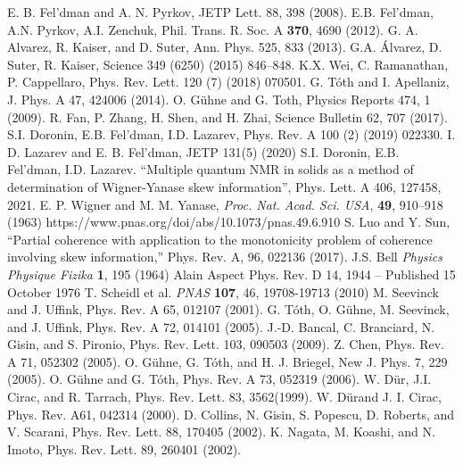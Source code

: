 \begin{thebibliography}{}
  E. B. Fel'dman and A. N. Pyrkov, JETP Lett. 88, 398 (2008).
  E.B. Fel'dman, A.N. Pyrkov, A.I. Zenchuk, Phil. Trans. R. Soc. A {\bf 370}, 4690 (2012).
  G. A. Alvarez, R. Kaiser, and D. Suter, Ann. Phys. 525, 833 (2013).
  G.A. Álvarez, D. Suter, R. Kaiser, Science 349 (6250) (2015) 846–848.
  K.X. Wei, C. Ramanathan, P. Cappellaro, Phys. Rev. Lett. 120 (7) (2018) 070501.
  G. T\'oth and I. Apellaniz, J. Phys. A 47, 424006 (2014).
  O. G\"uhne and G. Toth, Physics Reports 474, 1 (2009).
  R. Fan, P. Zhang, H. Shen, and H. Zhai, Science Bulletin 62, 707 (2017).
  S.I. Doronin, E.B. Fel’dman, I.D. Lazarev, Phys. Rev. A 100 (2) (2019) 022330.
  I. D. Lazarev and E. B. Fel'dman, JETP 131(5) (2020)
  S.I. Doronin, E.B. Fel’dman, I.D. Lazarev. “Multiple quantum NMR in solids as a method of determination of Wigner-Yanase skew information”, Phys. Lett. A 406, 127458, 2021.
  E. P. Wigner and M. M. Yanase, \textit{Proc. Nat. Acad. Sci. USA}, \textbf{49}, 910–918 (1963) https://www.pnas.org/doi/abs/10.1073/pnas.49.6.910
  S. Luo and Y. Sun, “Partial coherence with application to the monotonicity problem of coherence involving skew information,” Phys. Rev. A, 96, 022136 (2017).
  J.S. Bell \textit{Physics Physique Fizika} \textbf{1}, 195 (1964)
  Alain Aspect Phys. Rev. D 14, 1944 – Published 15 October 1976
  T. Scheidl et al. \textit{PNAS} \textbf{107}, 46, 19708-19713 (2010)
  M. Seevinck and J. Uffink, Phys. Rev. A 65, 012107 (2001).
  G. T\'oth, O. G\"uhne, M. Seevinck, and J. Uffink, Phys. Rev. A 72, 014101 (2005).
  J.-D. Bancal, C. Branciard, N. Gisin, and S. Pironio, Phys. Rev. Lett. 103, 090503 (2009).
  Z. Chen, Phys. Rev. A 71, 052302 (2005).
  O. G\"uhne, G. T\'oth, and H. J. Briegel, New J. Phys. 7, 229 (2005).
   O. G\"uhne and G. T\'oth, Phys. Rev. A 73, 052319 (2006).
  W. D\"ur, J.I. Cirac, and R. Tarrach, Phys. Rev. Lett. 83, 3562(1999).
  W. D\"urand J. I. Cirac, Phys. Rev. A61, 042314 (2000).
  D. Collins, N. Gisin, S. Popescu, D. Roberts, and V. Scarani, Phys. Rev. Lett. 88, 170405 (2002).
  K. Nagata, M. Koashi, and N. Imoto, Phys. Rev. Lett. 89, 260401 (2002).

\end{thebibliography}
